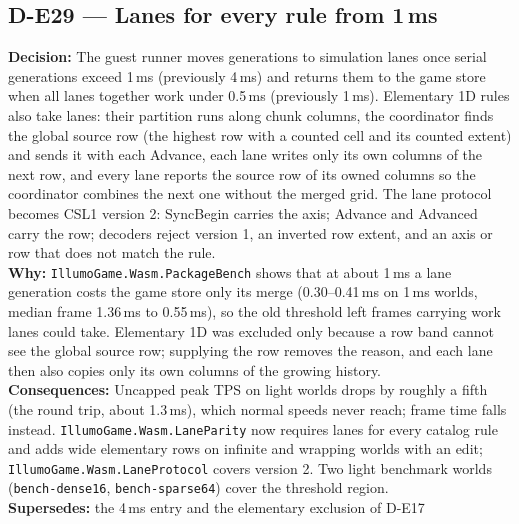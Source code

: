 \subsection*{D-E29 --- Lanes for every rule from 1\,ms}
\begin{decisionbox}[title={D-E29 \quad 2026-09-25}]
\textbf{Decision:} The guest runner moves generations to simulation lanes once
serial generations exceed 1\,ms (previously 4\,ms) and returns them to the game
store when all lanes together work under 0.5\,ms (previously 1\,ms).
Elementary 1D rules also take lanes: their partition runs along chunk columns,
the coordinator finds the global source row (the highest row with a counted
cell and its counted extent) and sends it with each Advance, each lane writes
only its own columns of the next row, and every lane reports the source row of
its owned columns so the coordinator combines the next one without the merged
grid. The lane protocol becomes CSL1 version 2: SyncBegin carries the axis;
Advance and Advanced carry the row; decoders reject version 1, an inverted row
extent, and an axis or row that does not match the rule.\\
\textbf{Why:} \texttt{IllumoGame.Wasm.PackageBench} shows that at about 1\,ms
a lane generation costs the game store only its merge (0.30--0.41\,ms on 1\,ms
worlds, median frame 1.36\,ms to 0.55\,ms), so the old threshold left
frames carrying work lanes could take. Elementary 1D was excluded only because
a row band cannot see the global source row; supplying the row removes the
reason, and each lane then also copies only its own columns of the growing
history.\\
\textbf{Consequences:} Uncapped peak TPS on light worlds drops by roughly a
fifth (the round trip, about 1.3\,ms), which normal speeds never reach; frame
time falls instead. \texttt{IllumoGame.Wasm.LaneParity} now requires lanes for
every catalog rule and adds wide elementary rows on infinite and wrapping
worlds with an edit; \texttt{IllumoGame.Wasm.LaneProtocol} covers version 2.
Two light benchmark worlds (\texttt{bench-dense16}, \texttt{bench-sparse64})
cover the threshold region.\\
\textbf{Supersedes:} the 4\,ms entry and the elementary exclusion of D-E17
\end{decisionbox}

